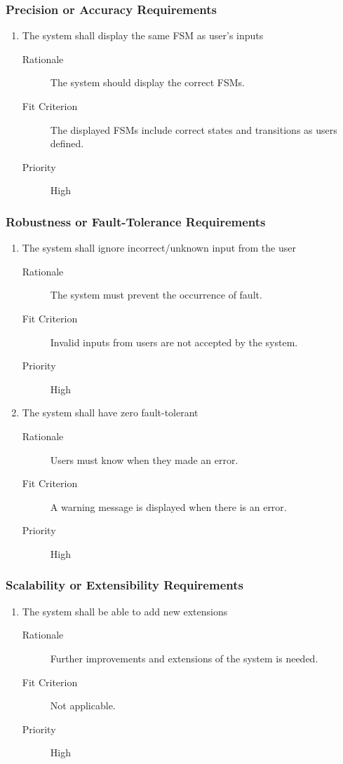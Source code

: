 \documentclass[12pt, titlepage]{article}
\begin{document}
\subsubsection{Precision or Accuracy Requirements}
\begin{enumerate}[resume*=NFR]
\item The system shall display the same FSM as user's inputs
  \begin{description}
  \item[Rationale] The system should display the correct FSMs.
  \item[Fit Criterion] The displayed FSMs include correct states and transitions as
    users defined.
  \item[Priority] High
  \end{description}

\end{enumerate}

\subsubsection{Robustness or Fault-Tolerance Requirements}
\begin{enumerate}[resume*=NFR]
\item The system shall ignore incorrect/unknown input from the user
  \begin{description}
  \item[Rationale] The system must prevent the occurrence of fault.
  \item[Fit Criterion] Invalid inputs from users are not accepted by the system.
  \item[Priority] High
  \end{description}

\item The system shall have zero fault-tolerant
  \begin{description}
  \item[Rationale] Users must know when they made an error.
  \item[Fit Criterion] A warning message is displayed when there is an error.
  \item[Priority] High
  \end{description}

\end{enumerate}

\subsubsection{Scalability or Extensibility Requirements}
\begin{enumerate}[resume*=NFR]
\item The system shall be able to add new extensions
  \begin{description}
  \item[Rationale] Further improvements and extensions of the system is needed.
  \item[Fit Criterion] Not applicable.
  \item[Priority] High
  \end{description}

\end{enumerate}
\end{document}
